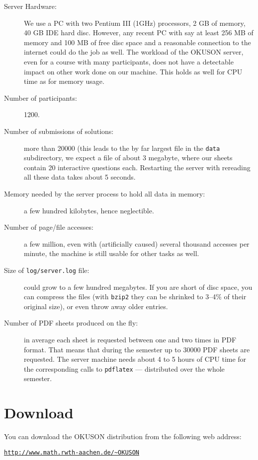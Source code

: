 \documentclass[12pt,openany,a4paper]{book}
\newcommand{\OKUSON}{\textsf{OKUSON}}
\begin{document}
\begin{description}
\item[Server Hardware:] We use a PC with two Pentium III (1GHz)
processors, 2 GB of memory, 40 GB IDE hard disc. However, any recent
PC with say at least 256 MB of memory and 100 MB of free disc space
and a reasonable connection to the internet could do the job as well.
The workload of the {\OKUSON} server, even for a course with many
participants, does not have a detectable impact on other work done on
our machine. This holds as well for CPU time as for memory usage.
\item[Number of participants:] 1200.
\item[Number of submissions of solutions:] more than 20000 (this leads to 
the by far
largest file in the \texttt{data} subdirectory, we expect a file of about 3
megabyte, where our sheets contain 20 interactive questions each.
Restarting the server with rereading all these data takes about 5 seconds.
\item[Memory needed by the server process to hold all data in memory:] a few
hundred kilobytes, hence neglectible.
\item[Number of page/file accesses:] a few million, even with (artificially 
caused) several thousand accesses per minute, the machine is still usable for
other tasks as well.
\item[Size of \texttt{log/server.log} file:] could grow to a few hundred
megabytes. If you are short of disc space, you can compress the files (with
\texttt{bzip2} they can be shrinked to 3--4\% of their original size), or
even throw away older entries.
\item[Number of PDF sheets produced on the fly:] in average each sheet is
requested between one and two times in  PDF format. That means that during
the semester up to 30000 PDF sheets are requested. The server machine needs
about 4 to 5 hours of CPU time for the corresponding calls to 
\texttt{pdflatex} --- distributed over the whole semester.
\end{description}

\section{Download}

You can download the {\OKUSON} distribution from the following web address:

\hspace*{1cm}\href{http://www.math.rwth-aachen.de/~OKUSON/}%
{\texttt{http://www.math.rwth-aachen.de/\~{}OKUSON}}
\end{document}
